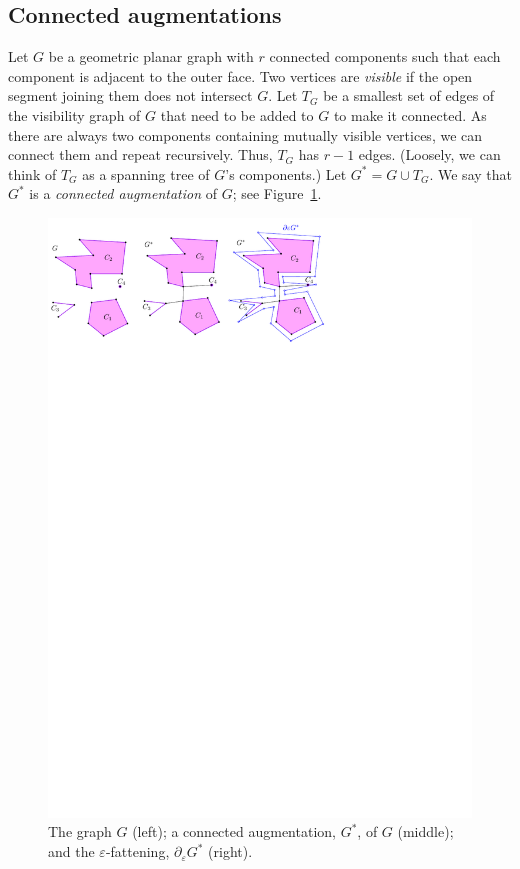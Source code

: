 \documentclass[11pt]{patmorin}
\begin{document}
\subsection{Connected augmentations}\label{section: connected augmentations}
Let $G$ be a geometric planar graph with $r$ connected components such that each component is adjacent to the outer face.
Two vertices are {\em visible} if the open segment joining them does not intersect $G$.
Let $T_G$ be a smallest set of edges of the visibility graph of $G$ that need to be added to $G$ to make it connected.
As there are always two components containing mutually visible vertices, we can connect them and repeat recursively.  Thus, $T_G$ has $r-1$ edges. (Loosely, we can think of $T_G$ as a spanning tree of $G$'s components.) Let $G^* = G\cup T_G$.  We say that $G^*$ is a \emph{connected augmentation} of $G$; see Figure~\ref{fig:Blowing}.

\begin{figure}[tb]
\centering
\includegraphics{img/Blowing.pdf}
\caption{The graph $G$ (left); a connected augmentation, $G^*$, of $G$ (middle); and the $\varepsilon$-fattening, $\partial_\varepsilon G^*$ (right).}
\label{fig:Blowing}
\end{figure}
\end{document}
